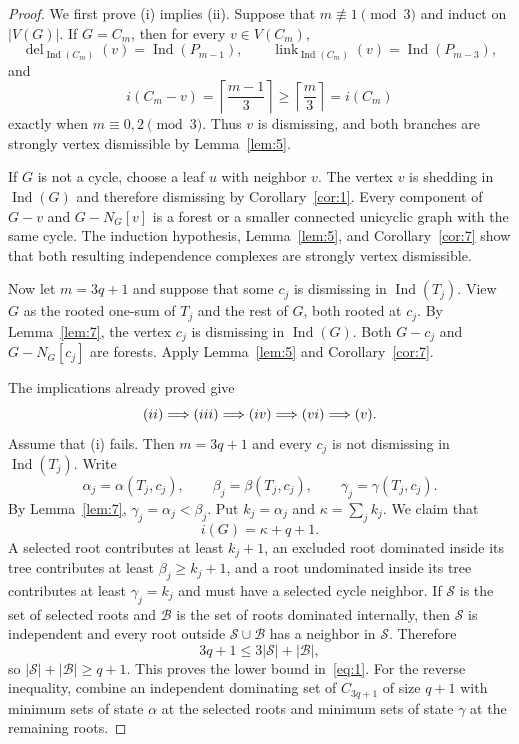 \documentclass[10pt,a4paper]{amsart}
\DeclareMathOperator{\Ind}{Ind}
\DeclareMathOperator{\del}{del}
\DeclareMathOperator{\link}{link}
\begin{document}
	\begin{proof}
		We first prove (i) implies (ii).  Suppose that $m\not\equiv1\pmod3$ and induct on $|V(G)|$.  If $G=C_m$, then for every $v\in V(C_m)$,
		\[
		\del_{\Ind(C_m)}(v)=\Ind(P_{m-1}),
		\qquad
		\link_{\Ind(C_m)}(v)=\Ind(P_{m-3}),
		\]
		and
		\[
		i(C_m-v)=\left\lceil\frac{m-1}{3}\right\rceil
		\geq \left\lceil\frac m3\right\rceil=i(C_m)
		\]
		exactly when $m\equiv0,2\pmod3$.  Thus $v$ is dismissing, and both branches are strongly vertex dismissible by Lemma~\ref{lem:5}.
		
		If $G$ is not a cycle, choose a leaf $u$ with neighbor $v$.  The vertex $v$ is shedding in $\Ind(G)$ and therefore dismissing by Corollary~\ref{cor:1}.  Every component of $G-v$ and $G-N_G[v]$ is a forest or a smaller connected unicyclic graph with the same cycle.  The induction hypothesis, Lemma~\ref{lem:5}, and Corollary~\ref{cor:7} show that both resulting independence complexes are strongly vertex dismissible.
		
		Now let $m=3q+1$ and suppose that some $c_j$ is dismissing in $\Ind(T_j)$.  View $G$ as the rooted one-sum of $T_j$ and the rest of $G$, both rooted at $c_j$.  By Lemma~\ref{lem:7}, the vertex $c_j$ is dismissing in $\Ind(G)$.  Both $G-c_j$ and $G-N_G[c_j]$ are forests.  Apply Lemma~\ref{lem:5} and Corollary~\ref{cor:7}.
		
		The implications already proved give
		\[
		\textup{(ii)}\Longrightarrow\textup{(iii)}
		\Longrightarrow\textup{(iv)}
		\Longrightarrow\textup{(vi)}
		\Longrightarrow\textup{(v)}.
		\]
		Assume that (i) fails.  Then $m=3q+1$ and every $c_j$ is not dismissing in $\Ind(T_j)$.  Write
		\[
		\alpha_j=\alpha(T_j,c_j),\qquad
		\beta_j=\beta(T_j,c_j),\qquad
		\gamma_j=\gamma(T_j,c_j).
		\]
		By Lemma~\ref{lem:7}, $\gamma_j=\alpha_j<\beta_j$.  Put $k_j=\alpha_j$ and $\kappa=\sum_jk_j$.  We claim that
		\begin{equation}\label{eq:1}
			i(G)=\kappa+q+1.
		\end{equation}
		A selected root contributes at least $k_j+1$, an excluded root dominated inside its tree contributes at least $\beta_j\geq k_j+1$, and a root undominated inside its tree contributes at least $\gamma_j=k_j$ and must have a selected cycle neighbor.  If $\mathcal S$ is the set of selected roots and $\mathcal B$ is the set of roots dominated internally, then $\mathcal S$ is independent and every root outside $\mathcal S\cup\mathcal B$ has a neighbor in $\mathcal S$.  Therefore
		\[
		3q+1\leq3|\mathcal S|+|\mathcal B|,
		\]
		so $|\mathcal S|+|\mathcal B|\geq q+1$.  This proves the lower bound in~\eqref{eq:1}. For the reverse inequality, combine an independent dominating set of $C_{3q+1}$ of size $q+1$ with minimum sets of state $\alpha$ at the selected roots and minimum sets of state $\gamma$ at the remaining roots.
		

\end{proof}
\end{document}
